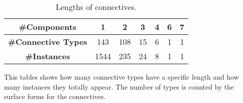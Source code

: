 \begin{table}[ht]
\centering
\begin{tabular}{|c|c|c|c|c|c|c|}
\hline
\bf \#Components        & 1    & 2   & 3  & 4 & 6 & 7 \\ \hline
\bf \#Connective Types  & 143  & 108 & 15 & 6 & 1 & 1 \\ \hline
\bf \#Instances         & 1544 & 235 & 24 & 8 & 1 & 1 \\ \hline
\end{tabular}
\caption{\label{t:connective-length} Lengths of connectives.}
This tables shows how many connective types have a specific length
and how many instances they totally appear. The number of types
is counted by the surface forms for the connectives.
\end{table}
